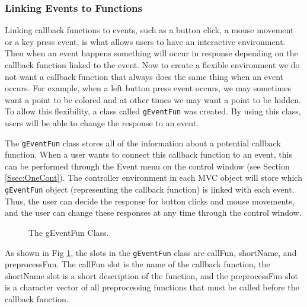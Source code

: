 \documentclass{article}[11pt]
\newcommand{\Robject}[1]{{\texttt{#1}}}
\begin{document}
\subsubsection{Linking Events to Functions}\label{Ssec:OneEvent}

Linking callback functions to events, such as a button click, a mouse movement
or a key press event, is what allows users to have an interactive
environment.  Then when an event happens something will occur in response
depending on the callback function linked to the event.  Now to create a
flexible environment we do not want a callback function that always does the
same thing when an event occurs.  For example, when a left button press event
occurs, we may sometimes want a point to be colored and at other times we may
want a point to be hidden.  To allow this flexibility, a class called
\Robject{gEventFun} was created.  By using this class, users will be able to
change the response to an event.  

The \Robject{gEventFun} class stores all of the information about a potential
callback function.  When a user wants to connect this callback function to an
event, this can be performed through the Event menu on the control window (see
Section \ref{Ssec:OneCont}).  The controller
environment in each MVC object will store which \Robject{gEventFun} object
(representing the callback function) is linked with each event.  Thus, the
user can decide the response for button clicks and mouse movements, and the
user can change these responses at any time through the control window.

\begin{figure}[ht]
  \begin{center}
    \caption{ The gEventFun Class. }
    \label{Fig:EventFun}
  \end{center}
\end{figure}

As shown in Fig \ref{Fig:EventFun}, the slots in the \Robject{gEventFun} class
are callFun, shortName, and preprocessFun.  The callFun slot is the name of
the callback function, the shortName slot is a short description of the
function, and the preprocessFun slot is a character vector of all
preprocessing functions that must be called before the callback function.
\end{document}
